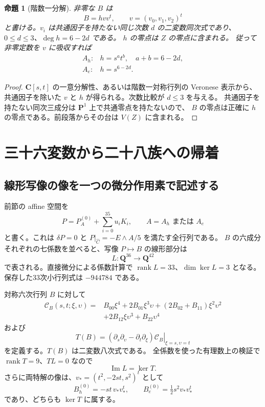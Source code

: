 \documentclass[11pt,a4paper]{ltjsarticle}
\newcommand{\CC}{\mathbf C}\newcommand{\QQ}{\mathbf Q}
\newcommand{\PP}{\mathbf P}\renewcommand{\AA}{\mathbf A}
\DeclareMathOperator{\rank}{rank}\DeclareMathOperator{\tr}{tr}
\newtheorem{proposition}[theorem]{命題}
\theoremstyle{remark}\newtheorem{remark}[theorem]{注意}
\begin{document}
\begin{proposition}[階数一分解]\label{prop:factorB}
非零な $B$ は
\[
                 B=hvv^t,\qquad v=(v_0,v_1,v_2)^t
\]
と書ける。$v_i$ は共通因子を持たない同じ次数 $d$ の二変数同次式であり、
$0\le d\le3$、$\deg h=6-2d$ である。
$h$ の零点は $Z$ の零点に含まれる。
従って非零定数を $v$ に吸収すれば
\[
\begin{array}{ll}
 A_h:&h=s^at^b,\quad a+b=6-2d,\\
 A_e:&h=s^{6-2d}.
\end{array}
\]
\end{proposition}
\begin{proof}
$\CC[s,t]$ の一意分解性、あるいは階数一対称行列の Veronese 表示から、
共通因子を除いた $v$ と $h$ が得られる。次数比較が $d\le3$ を与える。
共通因子を持たない同次三成分は $\PP^1$ 上で共通零点を持たないので、
$B$ の零点は正確に $h$ の零点である。前段落からその台は $V(Z)$ に含まれる。
\end{proof}


\section{三十六変数から二十八族への帰着}

\subsection{線形写像の像を一つの微分作用素で記述する}

前節の affine 空間を
\[
 P=P_A^{(0)}+\sum_{i=0}^{35}u_iK_i,\qquad A=A_h\text{ または }A_e
\]
と書く。これは $\delta P=0$ と $P|_{\widehat C}=-E\wedge A/5$ を満たす全行列である。
$B$ の六成分それぞれの七係数を並べると、写像 $P\mapsto B$ の線形部分は
\[
                   L:\QQ^{36}\longrightarrow\QQ^{42}
\]
で表される。直接微分による係数計算で $\rank L=33$、$\dim\ker L=3$ となる。
保存した33次小行列式は $-944784$ である。

対称六次行列 $B$ に対して
\[
\begin{split}
 \mathcal C_B(s,t;\xi,\upsilon)
 ={}&B_{00}\xi^4+2B_{01}\xi^3\upsilon
 +(2B_{02}+B_{11})\xi^2\upsilon^2\\
 &+2B_{12}\xi\upsilon^3+B_{22}\upsilon^4
\end{split}
\]
および
\begin{equation}\label{eq:T}
 T(B)=\left.(\partial_s\partial_\upsilon-\partial_t\partial_\xi)
                \mathcal C_B\right|_{\xi=s,\upsilon=t}
\end{equation}
を定義する。$T(B)$ は二変数八次式である。
全係数を使った有理数上の検証で $\rank T=9$、$TL=0$ なので
\begin{equation}\label{eq:imageL}
                         \operatorname{Im}L=\ker T.
\end{equation}
さらに両特解の像は、$v_*=(t^2,-2st,s^2)^t$ として
\[
 B_h^{(0)}=-st\,v_*v_*^t,\qquad
 B_e^{(0)}=\tfrac12s^2v_*v_*^t
\]
であり、どちらも $\ker T$ に属する。
\end{document}
